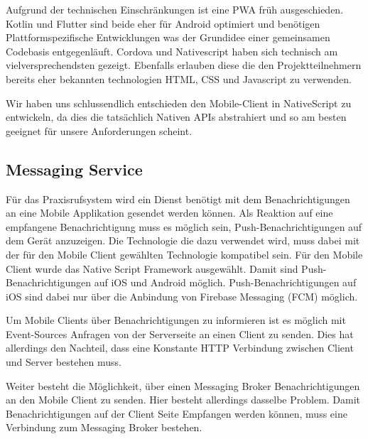 Aufgrund der technischen Einschränkungen ist eine PWA früh ausgeschieden.
Kotlin und Flutter sind beide eher für Android optimiert und benötigen Plattformspezifische Entwicklungen was der Grundidee einer gemeinsamen Codebasis entgegenläuft.
Cordova und Nativescript haben sich technisch am vielversprechendsten gezeigt.
Ebenfalls erlauben diese die den Projektteilnehmern bereits eher bekannten technologien HTML, CSS und Javascript zu verwenden.

Wir haben uns schlussendlich entschieden den Mobile-Client in NativeScript zu entwickeln, da dies die tatsächlich Nativen APIs abstrahiert und so am besten geeignet für unsere Anforderungen scheint.

\subsection{Messaging Service}\label{subsec:messaging-eval}

Für das Praxisrufsystem wird ein Dienst benötigt mit dem Benachrichtigungen an eine Mobile Applikation gesendet werden können.
Als Reaktion auf eine empfangene Benachrichtigung muss es möglich sein, Push-Benachrichtigungen auf dem Gerät anzuzeigen.
Die Technologie die dazu verwendet wird, muss dabei mit der für den Mobile Client gewählten Technologie kompatibel sein.
Für den Mobile Client wurde das Native Script Framework ausgewählt.
Damit sind Push-Benachrichtigungen auf iOS und Android möglich.
Push-Benachrichtigungen auf iOS sind dabei nur über die Anbindung von Firebase Messaging (FCM) möglich.\cite{nativescript-push}

Um Mobile Clients über Benachrichtigungen zu informieren ist es möglich mit Event-Sources\cite{event-source} Anfragen von der Serverseite an einen Client zu senden.
Dies hat allerdings den Nachteil, dass eine Konstante HTTP Verbindung zwischen Client und Server bestehen muss.

Weiter besteht die Möglichkeit, über einen Messaging Broker Benachrichtigungen an den Mobile Client zu senden.
Hier besteht allerdings dasselbe Problem.
Damit Benachrichtigungen auf der Client Seite Empfangen werden können, muss eine Verbindung zum Messaging Broker bestehen.


